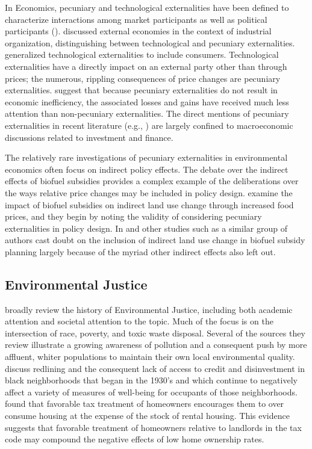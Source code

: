 \documentclass[ecta,nameyear,draft]{econsocart}
\theoremstyle{plain}
\theoremstyle{remark}
\begin{document}
In Economics, pecuniary and technological externalities have been defined to characterize interactions among market participants as well as political participants (\cite{holcombe01}). \cite{scitovsky54} discussed external economies in the context of industrial organization, distinguishing between technological and pecuniary externalities. \cite{buchananstubblebine} generalized technological externalities to include consumers. Technological externalities have a directly impact on an external party other than through prices; the numerous, rippling consequences of price changes are pecuniary externalities. \cite{holcombe01} suggest that because pecuniary externalities do not result in economic inefficiency, the associated losses and gains have received much less attention than non-pecuniary externalities. The direct mentions of pecuniary externalities in recent literature (e.g., \cite{davila18}) are largely confined to macroeconomic discussions related to investment and finance. 

The relatively rare investigations of pecuniary externalities in environmental economics often focus on indirect policy effects. The debate over the indirect effects of biofuel subsidies provides a complex example of the deliberations over the ways relative price changes may be included in policy design. \cite{zilberman11} examine the impact of biofuel subsidies on indirect land use change through increased food prices, and they begin by noting the validity of considering pecuniary externalities in policy design. In \cite{zilberman11} and other studies such as \cite{zilberman13} a similar group of authors cast doubt on the inclusion of indirect land use change in biofuel subsidy planning largely because of the myriad other indirect effects also left out.



\subsection{Environmental Justice} 
\cite{mohai09} broadly review the history of Environmental Justice, including both academic attention and societal attention to the topic. Much of the focus is on the intersection of race, poverty, and toxic waste disposal. Several of the sources they review illustrate a growing awareness of pollution and a consequent push by more affluent, whiter populations to maintain their own local environmental quality.  \cite{aaronson2021} discuss redlining and the consequent lack of access to credit and disinvestment in black neighborhoods that began in the 1930's and which continue to negatively affect a variety of measures of well-being for occupants of those neighborhoods. \cite{gervais2002} found that favorable tax treatment of homeowners encourages them to over consume housing at the expense of the stock of rental housing. This evidence suggests that favorable treatment of homeowners relative to landlords in the tax code may compound the negative effects of low home ownership rates.
\end{document}

